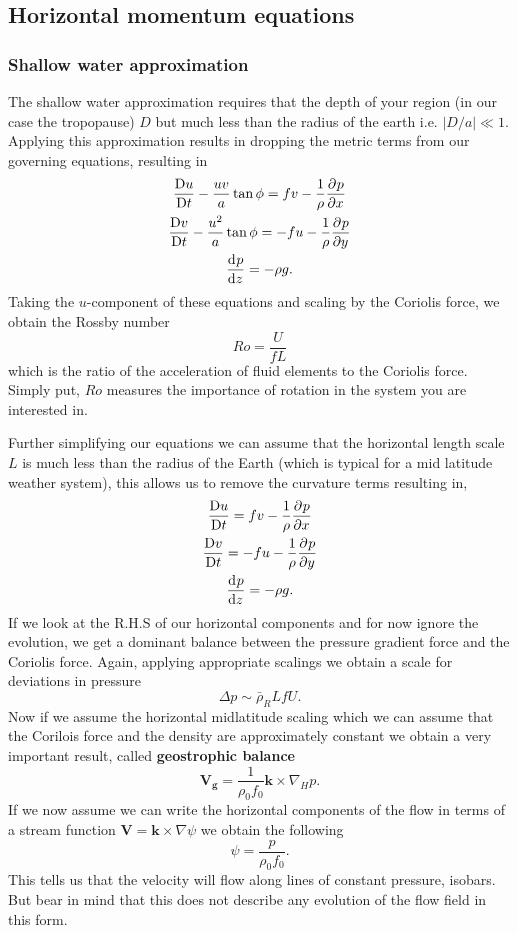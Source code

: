 \subsection{Horizontal momentum equations} 
\subsubsection{Shallow water approximation}
The shallow water approximation requires that the depth of your region (in our case the tropopause) $D$ but much less than the radius of the earth i.e. $|D/a|\ll1$. Applying this approximation results in dropping the metric terms from our governing equations, resulting in 
\begin{gather*}
\displaystyle \frac{{\rm D} u}{{\rm D} t}-\frac{uv}{a}\tan\phi = fv - \frac{1}{\rho}\displaystyle \frac{\partial^{} p}{\partial x^{}}\\
\displaystyle \frac{{\rm D} v}{{\rm D} t}-\frac{u^2}{a}\tan\phi=-fu-\frac{1}{\rho}\displaystyle \frac{\partial^{} p}{\partial y^{}}\\
\displaystyle \frac{{\rm d}^{} p}{{\rm d} z^{}}=-\rho g.
\end{gather*}
Taking the $u$-component of these equations and scaling by the Coriolis force, we obtain the Rossby number $$Ro = \frac{U}{fL}$$ which is the ratio of the acceleration of fluid elements to the Coriolis force. Simply put, $Ro$ measures the importance of rotation in the system you are interested in.

Further simplifying our equations we can assume that the horizontal length scale $L$ is much less than the radius of the Earth (which is typical for a mid latitude weather system), this allows us to remove the curvature terms resulting in,
\begin{gather*}
    \displaystyle \frac{{\rm D} u}{{\rm D} t} = fv - \frac{1}{\rho}\displaystyle \frac{\partial^{} p}{\partial x^{}}\\
    \displaystyle \frac{{\rm D} v}{{\rm D} t}=-fu-\frac{1}{\rho}\displaystyle \frac{\partial^{} p}{\partial y^{}}\\
    \displaystyle \frac{{\rm d}^{} p}{{\rm d} z^{}}=-\rho g.
\end{gather*}
If we look at the R.H.S of our horizontal components and for now ignore the evolution, we get a dominant balance between the pressure gradient force and the Coriolis force. Again, applying appropriate scalings we obtain a scale for deviations in pressure $$\Delta p \sim \bar{\rho}_R LfU.$$ Now if we assume the horizontal midlatitude scaling which we can assume that the Corilois force and the density are approximately constant we obtain a very important result, called \textbf{geostrophic balance} 
\begin{equation}
    \bm{V_g}=\frac{1}{\rho_0f_0}\bm{k}\times\nabla_Hp.
\end{equation}
If we now assume we can write the horizontal components of the flow in terms of a stream function $\bm{V} = \bm{k}\times\nabla\psi$ we obtain the following $$\psi=\frac{p}{\rho_0f_0}.$$ This tells us that the velocity will flow along lines of constant pressure, isobars. But bear in mind that this does not describe any evolution of the flow field in this form. 

